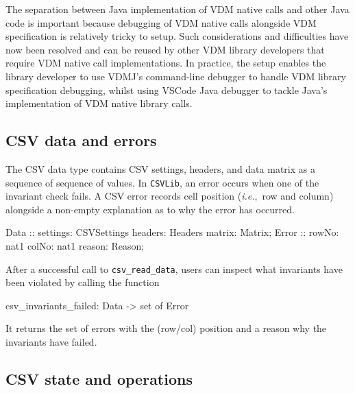 \documentclass[runningheads,a4paper]{llncs}
\begin{document}
The separation between Java implementation of VDM native calls and other Java code is important because debugging of VDM native calls alongside VDM specification is relatively tricky to setup. Such considerations and difficulties have now been resolved and can be reused by other VDM library developers that require VDM native call implementations. In practice, the setup enables the library developer to use VDMJ's command-line debugger to handle VDM library specification debugging, whilst using VSCode Java debugger to tackle Java's implementation of VDM native library calls. 
 
\subsection*{CSV data and errors}\label{subsec:DataAndErrors}

The CSV data type contains CSV settings, headers, and data matrix as a sequence of sequence of values. In \texttt{CSVLib}, an error occurs when one of the invariant check fails. A CSV error records cell position (\textit{i.e.},~row and column) alongside a non-empty explanation as to why the error has occurred.    
%
\begin{vdmsl}[frame=none,basicstyle=\ttfamily\scriptsize]
  Data :: settings: CSVSettings headers: Headers matrix: Matrix;
 Error :: rowNo: nat1 colNo: nat1 reason: Reason;
\end{vdmsl}  
%
\noindent After a successful call to \texttt{csv\_read\_data}, users can inspect what invariants have been violated by calling the function 
%
\begin{vdmsl}[frame=none,basicstyle=\ttfamily\scriptsize]
    csv_invariants_failed: Data -> set of Error
\end{vdmsl}
%
\noindent It returns the set of errors with the (row/col) position and a reason why the invariants have failed.  

\subsection*{CSV state and operations}\label{subsec:StateOps}
\end{document}

